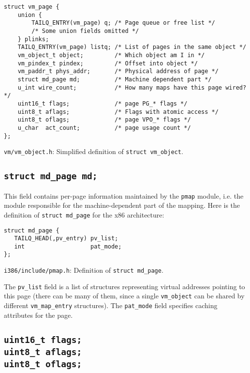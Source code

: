 \documentclass[shortabstract, english]{iithesis}
\begin{document}
\begin{listing}[H]
\begin{verbatim}
struct vm_page {
    union {
        TAILQ_ENTRY(vm_page) q; /* Page queue or free list */
        /* Some union fields omitted */
    } plinks;
    TAILQ_ENTRY(vm_page) listq; /* List of pages in the same object */
    vm_object_t object;         /* Which object am I in */
    vm_pindex_t pindex;         /* Offset into object */
    vm_paddr_t phys_addr;       /* Physical address of page */
    struct md_page md;          /* Machine dependent part */
    u_int wire_count;           /* How many maps have this page wired? */
    uint16_t flags;             /* page PG_* flags */
    uint8_t aflags;             /* Flags with atomic access */
    uint8_t oflags;             /* page VPO_* flags */
    u_char  act_count;          /* page usage count */
};
\end{verbatim}
\caption{\texttt{vm/vm\_object.h}: Simplified definition of \texttt{struct vm_object}.}
\end{listing}

\subsection*{\texttt{struct md_page md;}}
This field contains per-page information maintained by the \texttt{pmap}
module, i.e. the module responsible for the machine-dependent part of the
mapping. Here is the definition of \texttt{struct md_page} for the x86
architecture:

\begin{listing}[H]
\begin{verbatim}
struct md_page {
   TAILQ_HEAD(,pv_entry) pv_list;
   int                   pat_mode;
};
\end{verbatim}
\caption{\texttt{i386/include/pmap.h}: Definition of \texttt{struct md_page}.}
\end{listing}

The \texttt{pv_list} field is a list of structures representing virtual
addresses pointing to this page (there can be many of them, since a single
\texttt{vm_object} can be shared by different
\texttt{vm_map_entry} structures). The \texttt{pat_mode} field
specifies caching attributes for the page.

\subsection*{\texttt{uint16_t flags;} \\ \texttt{uint8_t aflags;}
  \\ \texttt{uint8_t oflags;}}
\end{document}
